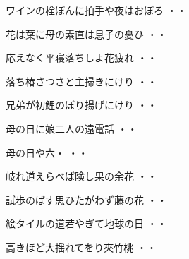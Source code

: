 \begin{shiika}ワインの栓ぼんに拍手や夜はおぼろ
\hfill{・・}\end{shiika}
\vspace{0.6cm}
\begin{shiika}花は葉に母の素直は息子の憂ひ
\hfill{・・}\end{shiika}
\vspace{0.6cm}
\begin{shiika}応えなく平寝落ちしよ花疲れ
\hfill{・・}\end{shiika}
\vspace{0.6cm}
\begin{shiika}落ち椿さつさと主掃きにけり
\hfill{・・}\end{shiika}
\vspace{0.6cm}
\begin{shiika}兄弟が初鯉のぼり揚げにけり
\hfill{・・}\end{shiika}
\vspace{0.6cm}
\begin{shiika}母の日に娘二人の遠電話
\hfill{・・}\end{shiika}
\vspace{0.6cm}
\begin{shiika}母の日や六・
\hfill{・・}\end{shiika}
\vspace{0.6cm}
\begin{shiika}岐れ道えらべば険し果の余花
\hfill{・・}\end{shiika}
\vspace{0.6cm}
\begin{shiika}試歩のばす思ひたがわず藤の花
\hfill{・・}\end{shiika}
\vspace{0.6cm}
\begin{shiika}絵タイルの道若やぎて地球の日
\hfill{・・}\end{shiika}
\vspace{0.6cm}
\begin{shiika}高きほど大揺れてをり夾竹桃
\hfill{・・}\end{shiika}
\vspace{0.6cm}
